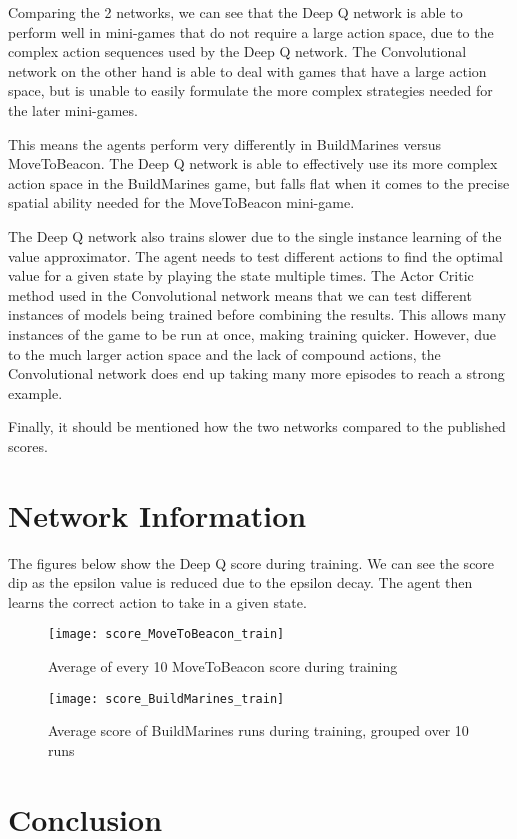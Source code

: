 Comparing the 2 networks, we can see that the Deep Q network is able to perform
well in mini-games that do not require a large action space, due to the complex
action sequences used by the Deep Q network. The Convolutional network on the
other hand is able to deal with games that have a large action space, but is
unable to easily formulate the more complex strategies needed for the later
mini-games.

This means the agents perform very differently in BuildMarines versus MoveToBeacon.
The Deep Q network is able to effectively use its more complex action space in
the BuildMarines game, but falls flat when it comes to the precise spatial
ability needed for the MoveToBeacon mini-game.

The Deep Q network also trains slower due to the single instance learning of the
value approximator. The agent needs to test different actions to find the
optimal value for a given state by playing the state multiple times. The Actor
Critic method used in the Convolutional network means that we can test different
instances of models being trained before combining the results. This allows many
instances of the game to be run at once, making training quicker. However, due
to the much larger action space and the lack of compound actions, the
Convolutional network does end up taking many more episodes to reach a strong
example.

Finally, it should be mentioned how the two networks compared to the published
scores. %

\section{Network Information}

The figures below show the Deep Q score during training. We can see the score
dip as the epsilon value is reduced due to the epsilon decay. The agent then
learns the correct action to take in a given state.

\begin{figure}[h]
  \centering
  \begin{minipage}[b]{0.4\textwidth}
    \texttt{[image: score\_MoveToBeacon\_train]}
    \caption{Average of every 10 MoveToBeacon score during training}
  \end{minipage}
  \hfill
  \begin{minipage}[b]{0.4\textwidth}
    \texttt{[image: score\_BuildMarines\_train]}
    \caption{Average score of BuildMarines runs during training, grouped over 10
    runs}
  \end{minipage}
\end{figure}


\section{Conclusion}
